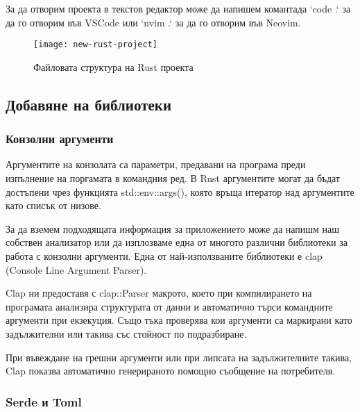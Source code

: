 За да отворим проекта в текстов редактор може да напишем комантада `code .` за
да го отворим във VSCode или `nvim .` за да го отворим във Neovim.
 
\begin{figure}[!htb]
  \texttt{[image: new-rust-project]}
  \centering
  \caption{Файловата структура на Rust проекта}
  \label{fig:new-rust-project}
\end{figure}

\subsection{Добавяне на библиотеки}

\subsubsection{Конзолни аргументи}
Аргументите на конзолата са параметри, предавани на програма преди изпълнение
на поргамата в командния ред. В Rust аргументите могат да бъдат достъпени чрез
функцията std::env::args(), която връща итератор над аргументите като списък от
низове.

За да вземем подходящата информация за приложението може да напишм наш собствен
анализатор или да изплозваме една от многото различни библиотеки за работа с
конзолни аргументи. Една от най-използваните библиотеки е clap (Console Line
Argument Parser).

Clap ни предоставя с clap::Parser макрото, което при компилирането на програмата
анализира структурата от данни и автоматично търси командните аргументи при екзекуция.
Също тъка проверява кои аргументи са маркирани като задължителни или такива със
стойност по подразбиране.

При въвеждане на грешни аргументи или при липсата на задължителните такива, Clap
показва автоматично генерираното помощно съобщение на потребителя.


\subsubsection{Serde и Toml}

